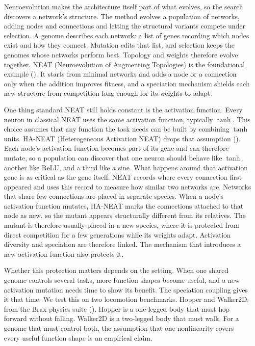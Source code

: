 \documentclass[12pt]{article}
\begin{document}
Neuroevolution makes the architecture itself part of what evolves, so the search discovers a network's structure.
The method evolves a population of networks, adding nodes and connections and letting the structural variants compete under selection.
A genome describes each network: a list of genes recording which nodes exist and how they connect.
Mutation edits that list, and selection keeps the genomes whose networks perform best.
Topology and weights therefore evolve together.
NEAT (Neuroevolution of Augmenting Topologies) is the foundational example (\cite{stanley_evolving_2002}).
It starts from minimal networks and adds a node or a connection only when the addition improves fitness, and a speciation mechanism shields each new structure from competition long enough for its weights to adapt.


One thing standard NEAT still holds constant is the activation function.
Every neuron in classical NEAT uses the same activation function, typically $\tanh$.
This choice assumes that any function the task needs can be built by combining $\tanh$ units.
HA-NEAT (Heterogeneous Activation NEAT) drops that assumption (\cite{hagg_evolving_2017}).
Each node's activation function becomes part of its gene and can therefore mutate, so a population can discover that one neuron should behave like $\tanh$, another like ReLU, and a third like a sine.
What happens around that activation gene is as critical as the gene itself.
NEAT records where every connection first appeared and uses this record to measure how similar two networks are. Networks that share few connections are placed in separate species.
When a node's activation function mutates, HA-NEAT marks the connections attached to that node as new, so the mutant appears structurally different from its relatives.
The mutant is therefore usually placed in a new species, where it is protected from direct competition for a few generations while its weights adapt.
Activation diversity and speciation are therefore linked. The mechanism that introduces a new activation function also protects it.

Whether this protection matters depends on the setting.
When one shared genome controls several tasks, more function shapes become useful, and a new activation mutation needs time to show its benefit.
The speciation coupling gives it that time.
We test this on two locomotion benchmarks. Hopper and Walker2D, from the Brax physics suite (\cite{freeman_brax_2021}).
Hopper is a one-legged body that must hop forward without falling. Walker2D is a two-legged body that must walk.
For a genome that must control both, the assumption that one nonlinearity covers every useful function shape is an empirical claim.
\end{document}
